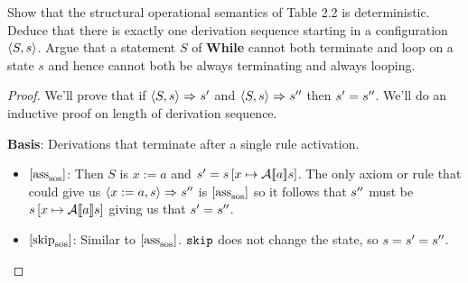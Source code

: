 
Show that the structural operational semantics of Table 2.2 is deterministic. Deduce that there is exactly one derivation sequence starting in a configuration $\left<S,s\right>$. Argue that a statement $S$ of \textbf{While} cannot both terminate and loop on a state $s$ and hence cannot both be always terminating and always looping.
\begin{proof}
We'll prove that if $\left<S,s\right> \Rightarrow^{} s^\prime$ and $\left<S,s\right> \Rightarrow^{} s^{\prime\prime}$ then $s^\prime=s^{\prime\prime}$. We'll do an inductive proof on length of derivation sequence.

\textbf{Basis}: Derivations that terminate after a single rule activation.
\begin{itemize}
	\item $\left[\text{ass}_{\text{sos}}^{\text{}}\right]$:  Then $S$ is $x:=a$ and $s^\prime=s\left[x \mapsto \mathcal{A}[\![a]\!] s\right]$. The only axiom or rule that could give us $\left<x:=a,s\right> \Rightarrow^{} s^{\prime\prime}$ is $\left[\text{ass}_{\text{sos}}^{\text{}}\right]$ so it follows that $s^{\prime\prime}$ must be $s\left[x \mapsto \mathcal{A}[\![a]\!] s\right]$ giving us that $s^\prime = s^{\prime\prime}$.
	\item $\left[\text{skip}_{\text{sos}}^{\text{}}\right]$: Similar to $\left[\text{ass}_{\text{sos}}^{\text{}}\right]$. $\texttt{skip}$ does not change the state, so $s=s^\prime=s^{\prime\prime}$.
\end{itemize}


\end{proof}
